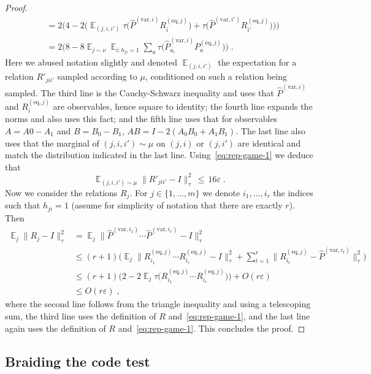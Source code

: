 \documentclass[11pt]{article}
\theoremstyle{definition}
\newcommand{\Id}{\ensuremath{I}}
\DeclareMathOperator*{\Expectation}{\mathbb{E}}
\newcommand{\Es}[1]{\Expectation_{#1}}
\newcommand{\eps}{\varepsilon}
\newcommand{\eq}{\mathrm{eq}}
\newcommand{\var}{\mathrm{var}}
\begin{document}
\begin{proof}
\begin{align*}
&= 2\Big(4-2\Big(\Es{(j,i,i')} \tau\big( \widehat{P}^{(\var,i)}  R^{(\eq,j)}_{i}\big) +\tau\big(\widehat{P}^{(\var,i')}  R^{(\eq,j)}_{i'}\big)\Big)\Big)\\
&=2\Big(8-8 \Es{j\sim \nu} \Es{i:h_{ji}=1}\sum_{a} \tau\big( \widehat{P}^{(\var,i)}_{a_i}  P^{(\eq,j)}_{a}\big)\Big)\;.
\end{align*}
Here we abused notation slightly and denoted $\Es{(j,i,i')}$ the expectation for a relation $R'_{jii'}$ sampled according to $\mu$, conditioned on such a relation being sampled. The third line is the Cauchy-Schwarz inequality and uses that $\widehat{P}^{(\var,i)}$ and $R^{(\eq,j)}_{i}$ are observables, hence square to identity; the fourth line expands the norms and also uses this fact; and the fifth line uses that for observables $A=A0-A_1$ and $B=B_0-B_1$, $AB=\Id-2(A_0B_0+A_1B_1)$. The last line also uses that the marginal of $(j,i,i')\sim\mu$ on $(j,i)$ or $(j,i')$ are identical and match the distribution indicated in the last line. Using~\eqref{eq:rep-game-1} we deduce that  
\[ \Es{(j,i,i')\sim\mu} \|R'_{jii'}-\Id\|_\tau^2 \,\leq\, 16\eps\;.\]
Now we consider the relations $R_j$. For $j\in\{1,\ldots,m\}$ we denote $i_1,\ldots,i_r$ the indices such that $h_{ji}=1$ (assume for simplicity of notation that there are exactly $r$). Then 
\begin{align*}
\Es{j} \|R_{j}-\Id\|_\tau^2
 &= \Es{j} \big\| \widehat{P}^{(\var,i_1)}\cdots \widehat{P}^{(\var,i_r)}-\Id\big\|_\tau^2\\
&\leq (r+1)\Big(\Es{j} \big\| R^{(\eq,j)}_{i_1}\cdots R^{(\eq,j)}_{i_r}-\Id\big\|_\tau^2 + \sum_{t=1}^r \big\|R^{(\eq,j)}_{i_t}-\widehat{P}^{(\var,i_t)}\big\|_\tau^2\Big)\\
&\leq (r+1)\big(2-2\Es{j}\tau\big( R^{(\eq,j)}_{i_1}\cdots R^{(\eq,j)}_{i_r}\big)\big) + O(r\eps)\\
&\leq O(r\eps)\;,
\end{align*}
where the second line follows from the triangle inequality and using a telescoping sum, the third line uses the definition of $R$ and~\eqref{eq:rep-game-1}, and the last line again uses the definition of $R$ and~\eqref{eq:rep-game-1}. This concludes the proof. 
\end{proof}





\subsection{Braiding the code test}
\label{sec:braiding}
\end{document}
